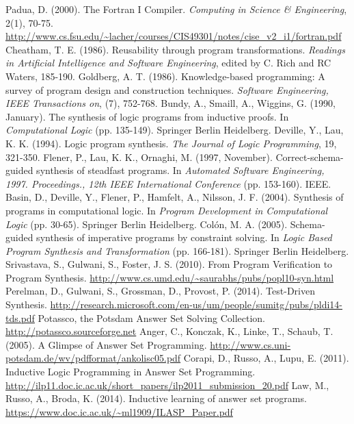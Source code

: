 \documentclass[a4paper,twoside,notitlepage]{report}
\begin{document}
\begin{thebibliography}{9}
        Padua, D. (2000). The Fortran I Compiler.
        \emph{Computing in Science \& Engineering}, 2(1), 70-75.
        \url{http://www.cs.fsu.edu/~lacher/courses/CIS49301/notes/cise_v2_i1/fortran.pdf}
        Cheatham, T. E. (1986). Reusability through program transformations. 
        \emph{Readings in Artificial Intelligence and Software Engineering}, 
        edited by C. Rich and RC Waters, 185-190.
        Goldberg, A. T. (1986). Knowledge-based programming:
        A survey of program design and construction techniques.
        \emph{Software Engineering, IEEE Transactions on}, (7), 752-768.
        Bundy, A., Smaill, A., Wiggins, G. (1990, January).
        The synthesis of logic programs from inductive proofs.
        In \emph{Computational Logic} (pp. 135-149). Springer Berlin Heidelberg.
        Deville, Y., Lau, K. K. (1994). Logic program synthesis.
        \emph{The Journal of Logic Programming}, 19, 321-350.
        Flener, P., Lau, K. K., Ornaghi, M. (1997, November). 
        Correct-schema-guided synthesis of steadfast programs.
        In \emph{Automated Software Engineering, 1997.
        Proceedings., 12th IEEE International Conference} (pp. 153-160). IEEE.
        Basin, D., Deville, Y., Flener, P., Hamfelt, A., Nilsson, J. F. (2004).
        Synthesis of programs in computational logic.
        In \emph{Program Development in Computational Logic} (pp. 30-65).
        Springer Berlin Heidelberg.
        Colón, M. A. (2005). Schema-guided synthesis of imperative programs by 
        constraint solving. In \emph{Logic Based Program Synthesis and 
        Transformation} (pp. 166-181). Springer Berlin Heidelberg.
        Srivastava, S., Gulwani, S., Foster, J. S. (2010).
        From Program Verification to Program Synthesis.
        \url{http://www.cs.umd.edu/~saurabhs/pubs/popl10-syn.html}
        Perelman, D., Gulwani, S., Grossman, D., Provost, P. (2014).
        Test-Driven Synthesis.
        \url{http://research.microsoft.com/en-us/um/people/sumitg/pubs/pldi14-tds.pdf}
        Potassco, the Potsdam Answer Set Solving Collection.
        \url{http://potassco.sourceforge.net}
        Anger, C., Konczak, K., Linke, T., Schaub, T. (2005).
        A Glimpse of Answer Set Programming.
        \url{http://www.cs.uni-potsdam.de/wv/pdfformat/ankolisc05.pdf}
        Corapi, D., Russo, A., Lupu, E. (2011).
        Inductive Logic Programming in Answer Set Programming.
        \url{http://ilp11.doc.ic.ac.uk/short_papers/ilp2011_submission_20.pdf}
        Law, M., Russo, A., Broda, K. (2014).
        Inductive learning of answer set programs.
        \url{https://www.doc.ic.ac.uk/~ml1909/ILASP_Paper.pdf}
\end{thebibliography}
\end{document}
